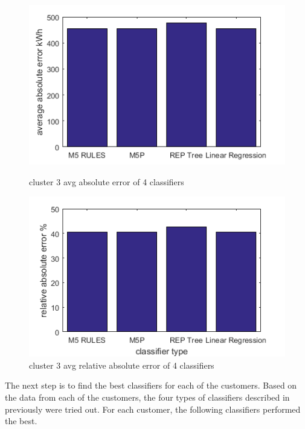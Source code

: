 \begin{figure}
\centering
\begin{minipage}{.5\textwidth}
  \centering
  \includegraphics[width=\linewidth]{cluster-3-diff-classifier-avg-abs.png}
  \caption{cluster 3 avg absolute error of 4 classifiers}
  \label{fig:cluster-3-predictors}
\end{minipage}%
\begin{minipage}{.5\textwidth}
  \centering
  \includegraphics[width=\linewidth]{cluster-3-diff-classifier-relative-abs.png}
  \caption{cluster 3 avg relative absolute error of 4 classifiers}
\end{minipage}

\end{figure}

The next step is to find the best classifiers for each of the customers. Based on the data from each of the customers, the four types of classifiers described in previously were tried out. For each customer, the following classifiers performed the best. 

